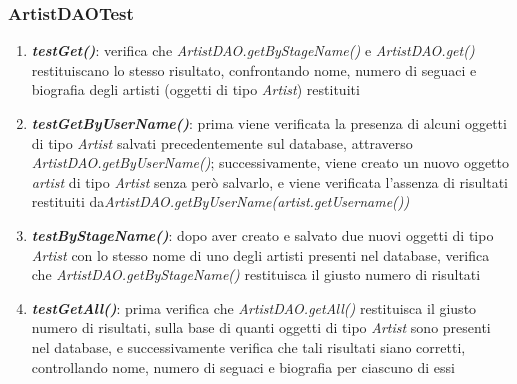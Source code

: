 \documentclass{article}
\begin{document}
  \subsubsection{ArtistDAOTest}
  \begin{enumerate}

    \item \textbf{\textit{testGet()}}: verifica che \textit{ArtistDAO.getByStageName()} e \textit{ArtistDAO.get()} restituiscano lo stesso risultato, confrontando nome, numero di seguaci e biografia degli artisti (oggetti di tipo \textit{Artist}) restituiti

    \item \textbf{\textit{testGetByUserName()}}: prima viene verificata la presenza di alcuni oggetti di tipo \textit{Artist} salvati precedentemente sul database, attraverso \textit{ArtistDAO.getByUserName()}; successivamente, viene creato un nuovo oggetto \textit{artist} di tipo \textit{Artist} senza però salvarlo, e viene verificata l'assenza di risultati restituiti da\textit{ArtistDAO.getByUserName(artist.getUsername())}

    \item \textbf{\textit{testByStageName()}}: dopo aver creato e salvato due nuovi oggetti di tipo \textit{Artist} con lo stesso nome di uno degli artisti presenti nel database, verifica che \textit{ArtistDAO.getByStageName()} restituisca il giusto numero di risultati

    \item \textbf{\textit{testGetAll()}}: prima verifica che \textit{ArtistDAO.getAll()} restituisca il giusto numero di risultati, sulla base di quanti oggetti di tipo \textit{Artist} sono presenti nel database, e successivamente verifica che tali risultati siano corretti, controllando nome, numero di seguaci e biografia per ciascuno di essi

  \end{enumerate}
\end{document}
